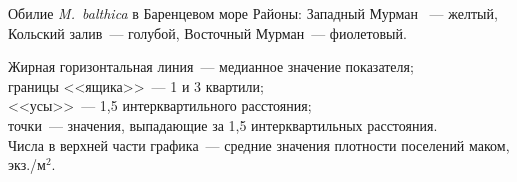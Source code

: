\documentclass{beamer}
\begin{document}
\begin{frame}{Обилие {\it M.~balthica} в Баренцевом море}
{\scriptsize Районы: Западный Мурман ~--- желтый, Кольский залив~--- голубой, Восточный Мурман~--- фиолетовый.}\\[1ex]
\begin{tiny}
 Жирная горизонтальная линия~--- медианное значение показателя;\\
границы <<ящика>>~--- 1 и 3 квартили;\\ <<усы>>~--- 1,5 интерквартильного расстояния;\\ 
точки~--- значения, выпадающие за 1,5 интерквартильных расстояния.\\ 
Числа в верхней части графика~--- средние значения плотности поселений маком, экз./м$^2$.
\end{tiny}
\end{frame}
\end{document}
